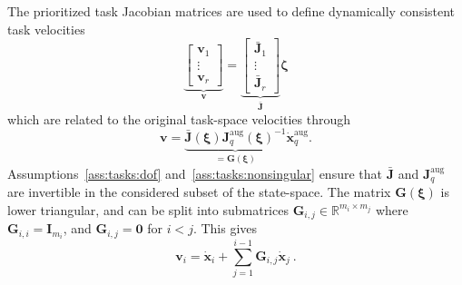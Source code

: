 \documentclass[../main.tex]{subfiles}
\begin{document}

The prioritized task Jacobian matrices are used to define dynamically consistent task velocities
\begin{equation}\label{eq:tasks:v}
    \underbrace{\begin{bmatrix}
        \bm{v}_1 \\ \vdots \\ \bm{v}_r
    \end{bmatrix}}_{\bm{v}} =
    \underbrace{\begin{bmatrix}
        \bar{\bm{J}}_1 \\ \vdots \\ \bar{\bm{J}}_r
    \end{bmatrix}}_{\bar{\bm{J}}} \bm{\zeta}
\end{equation}
which are related to the original task-space velocities through
\begin{equation}
    \bm{v} = \underbrace{\bar{\bm{J}}(\bm{\xi}) \bm{J}^{\textrm{aug}}_q(\bm{\xi})^{-1}}_{= \bm{G}(\bm{\xi})} \dot{\bm{x}}^{\textrm{aug}}_q .
\end{equation}
Assumptions~\ref{ass:tasks:dof} and~\ref{ass:tasks:nonsingular} ensure that $\bar{\bm{J}}$ and $\bm{J}^{\textrm{aug}}_q$ are invertible in the considered subset of the state-space. The matrix $\bm{G}(\bm{\xi})$ is lower triangular, and can be split into submatrices $\bm{G}_{i,j} \in \mathbb{R}^{m_i \times m_j}$ where $\bm{G}_{i,i} = \bm{I}_{m_i}$, and $\bm{G}_{i,j} = \bm{0}$ for $i < j$. This gives
\begin{equation}\label{eq:tasks:vGxdot}
    \bm{v}_i = \dot{\bm{x}}_i + \sum_{j=1}^{i-1} \bm{G}_{i,j} \dot{\bm{x}}_j \ .
\end{equation}
\end{document}
